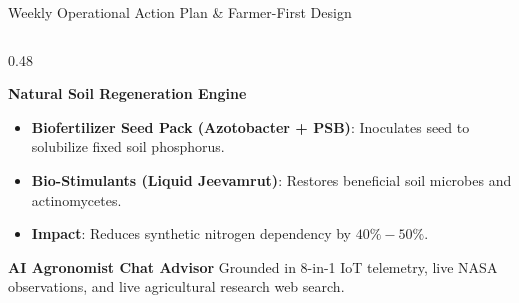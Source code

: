 \documentclass[aspectratio=169,10pt]{beamer}
\begin{document}
\begin{frame}{Weekly Operational Action Plan \& Farmer-First Design}
\begin{columns}[T]
\begin{column}{0.48\textwidth}
\begin{block}{\textbf{Natural Soil Regeneration Engine}}
\begin{itemize}
                    \item \textbf{Biofertilizer Seed Pack (Azotobacter + PSB)}: Inoculates seed to solubilize fixed soil phosphorus.
                    \item \textbf{Bio-Stimulants (Liquid Jeevamrut)}: Restores beneficial soil microbes and actinomycetes.
                    \item \textbf{Impact}: Reduces synthetic nitrogen dependency by $40\%-50\%$.
                \end{itemize}
            \end{block}
            \vspace{0.2cm}
            \begin{exampleblock}{\textbf{AI Agronomist Chat Advisor}}
                \scriptsize
                Grounded in 8-in-1 IoT telemetry, live NASA observations, and live agricultural research web search.
            \end{exampleblock}
        \end{column}
    \end{columns}
\end{frame}
\end{document}
